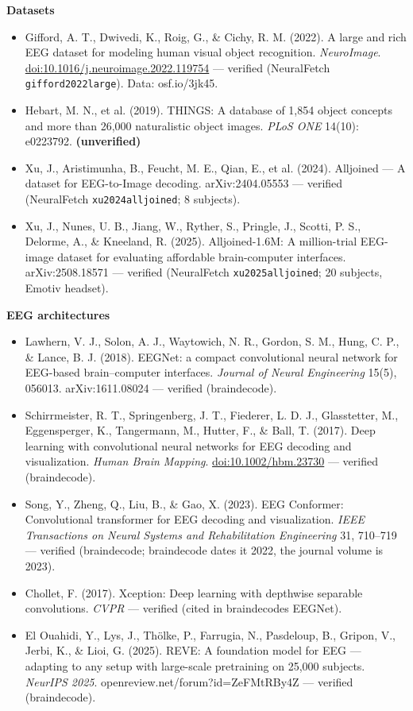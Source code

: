 \documentclass[
  11pt,
]{article}
\providecommand{\tightlist}{%
  \setlength{\itemsep}{0pt}\setlength{\parskip}{0pt}}
\renewcommand{\_}{\oldunderscore\allowbreak}
\begin{document}
\textbf{Datasets}

\begin{itemize}
\tightlist
\item
  Gifford, A. T., Dwivedi, K., Roig, G.,
  \& Cichy, R. M. (2022). A large and
  rich EEG dataset for modeling human
  visual object recognition.
  \emph{NeuroImage}.
  \url{doi:10.1016/j.neuroimage.2022.119754}
  --- verified (NeuralFetch
  \texttt{gifford2022large}). Data:
  osf.io/3jk45.
\item
  Hebart, M. N., et al. (2019). THINGS:
  A database of 1,854 object concepts
  and more than 26,000 naturalistic
  object images. \emph{PLoS ONE} 14(10):
  e0223792. \textbf{(unverified)}
\item
  Xu, J., Aristimunha, B., Feucht, M.
  E., Qian, E., et al. (2024). Alljoined
  --- A dataset for EEG-to-Image
  decoding. arXiv:2404.05553 ---
  verified (NeuralFetch
  \texttt{xu2024alljoined}; 8 subjects).
\item
  Xu, J., Nunes, U. B., Jiang, W.,
  Ryther, S., Pringle, J., Scotti, P.
  S., Delorme, A., \& Kneeland, R.
  (2025). Alljoined-1.6M: A
  million-trial EEG-image dataset for
  evaluating affordable brain-computer
  interfaces. arXiv:2508.18571 ---
  verified (NeuralFetch
  \texttt{xu2025alljoined}; 20 subjects,
  Emotiv headset).
\end{itemize}

\textbf{EEG architectures}

\begin{itemize}
\tightlist
\item
  Lawhern, V. J., Solon, A. J.,
  Waytowich, N. R., Gordon, S. M., Hung,
  C. P., \& Lance, B. J. (2018). EEGNet:
  a compact convolutional neural network
  for EEG-based brain--computer
  interfaces. \emph{Journal of Neural
  Engineering} 15(5), 056013.
  arXiv:1611.08024 --- verified
  (braindecode).
\item
  Schirrmeister, R. T., Springenberg, J.
  T., Fiederer, L. D. J., Glasstetter,
  M., Eggensperger, K., Tangermann, M.,
  Hutter, F., \& Ball, T. (2017). Deep
  learning with convolutional neural
  networks for EEG decoding and
  visualization. \emph{Human Brain
  Mapping}. \url{doi:10.1002/hbm.23730}
  --- verified (braindecode).
\item
  Song, Y., Zheng, Q., Liu, B., \& Gao,
  X. (2023). EEG Conformer:
  Convolutional transformer for EEG
  decoding and visualization. \emph{IEEE
  Transactions on Neural Systems and
  Rehabilitation Engineering} 31,
  710--719 --- verified (braindecode;
  braindecode dates it 2022, the journal
  volume is 2023).
\item
  Chollet, F. (2017). Xception: Deep
  learning with depthwise separable
  convolutions. \emph{CVPR} --- verified
  (cited in
  braindecode\textquotesingle s EEGNet).
\item
  El Ouahidi, Y., Lys, J., Thölke, P.,
  Farrugia, N., Pasdeloup, B., Gripon,
  V., Jerbi, K., \& Lioi, G. (2025).
  REVE: A foundation model for EEG ---
  adapting to any setup with large-scale
  pretraining on 25,000 subjects.
  \emph{NeurIPS 2025}.
  openreview.net/forum?id=ZeFMtRBy4Z ---
  verified (braindecode).
\end{itemize}
\end{document}
